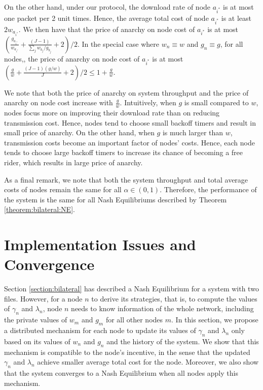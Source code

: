 \documentclass[11pt, conference]{IEEEtran}
\begin{document}
On the other hand, under our protocol, the download rate of node $a_{i^*}$ is at most one packet per 2 unit times. Hence, the average total cost of node $a_{i^*}$ is at least $2w_{a_{i^*}}$. We then have that the price of anarchy on node cost of $a_{i^*}$ is at most $(\frac{g_{a_{i^*}}}{w_{a_{i^*}}}+\frac{(J-1)}{\sum_jw_{b_j}/g_{b_j}}+2)/2$. In the special case where $w_n\equiv w$ and $g_n\equiv g$, for all nodes,, the price of anarchy on node cost of $a_{i^*}$ is at most $(\frac{g}{w}+\frac{(J-1)(g/w)}{J}+2)/2\leq 1+\frac{g}{w}.$

We note that both the price of anarchy on system throughput and the price of anarchy on node cost increase with $\frac{g}{w}$. Intuitively, when $g$ is small compared to $w$, nodes focus more on improving their download rate than on reducing transmission cost. Hence, nodes tend to choose small backoff timers and result in small price of anarchy. On the other hand, when $g$ is much larger than $w$, transmission costs become an important factor of nodes' costs. Hence, each node tends to choose large backoff timers to increase its chance of becoming a free rider, which results in large price of anarchy.

As a final remark, we note that both the system throughput and total average costs of nodes remain the same for all $\alpha\in(0,1)$. Therefore, the performance of the system is the same for all Nash Equilibriums described by Theorem \ref{theorem:bilateral:NE}.



\section{Implementation Issues and Convergence}	\label{section:implementation}

Section \ref{section:bilateral} has described a Nash Equilibrium for a system with two files. However, for a node $n$ to derive its strategies, that is, to compute the values of $\gamma_n$ and $\lambda_n$, node $n$ needs to know information of the whole network, including the private values of $w_m$ and $g_m$ for all other nodes $m$. In this section, we propose a distributed mechanism for each node to update its values of $\gamma_n$ and $\lambda_n$ only based on its values of $w_n$ and $g_n$ and the history of the system. We show that this mechanism is compatible to the node's incentive, in the sense that the updated $\gamma_n$ and $\lambda_n$ achieve smaller average total cost for the node. Moreover, we also show that the system converges to a Nash Equilibrium when all nodes apply this mechanism.
\end{document}
